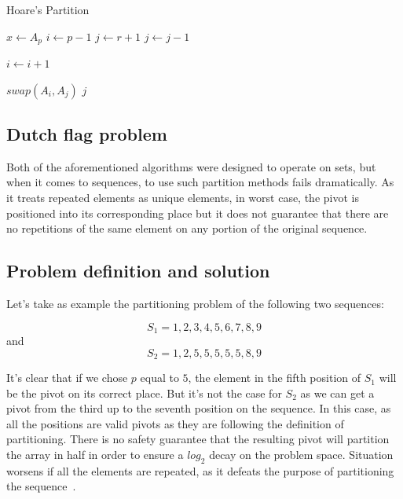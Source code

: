 \begin{algorithm}
\caption{Hoare's Partition}\label{ALG:HOARE_PARTITION}
\begin{algorithmic}[1]
    \State $x \gets A_p$
    \State $i \gets p-1$
    \State $j \gets r+1$
        \Do 
            \State $j \gets j - 1$

        \Do 
            \State $i \gets i + 1$

            \State $swap(A_i, A_j)$
        \Else
            \State \Return $j$
        \EndIf
    \EndWhile
    \EndProcedure
\end{algorithmic}
\end{algorithm}

\subsection{Dutch flag problem}
\label{SUBSEC:DUTCH_FLAG_PROBLEM}
Both of the aforementioned algorithms were designed to operate on sets, but when it comes to sequences, to use such partition methods fails dramatically. As it treats repeated elements as unique elements, in worst case, the pivot is positioned into its corresponding place but it does not guarantee that there are no repetitions of the same element on any portion of the original sequence.

\subsection{Problem definition and solution}
\label{SUBSECITON:PARTITIONING_PROBLEM}
Let's take as example the partitioning problem of the following two sequences:

$$ S_1={1,2,3,4,5,6,7,8,9} $$
and
$$S_2={1,2,5,5,5,5,5,8,9}$$

It's clear that if we chose $p$ equal to $5$, the element in the fifth position of $S_1$ will be the pivot on its correct place. But it's not the case for $S_2$ as we can get a pivot from the third up to the seventh position on the sequence. In this case, as all the positions are valid pivots as they are following the definition of partitioning. There is no safety guarantee that the resulting pivot will partition the array in half in order to ensure a $log_2$ decay on the problem space. Situation worsens if all the elements are repeated, as it defeats the purpose of partitioning the sequence~\cite{7416566}.

